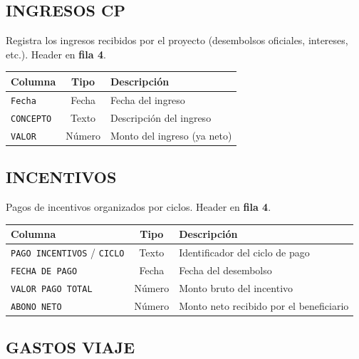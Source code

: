 \documentclass[11pt,a4paper]{article}
\begin{document}
\subsection{INGRESOS CP}

Registra los ingresos recibidos por el proyecto (desembolsos oficiales, intereses, etc.). Header en \textbf{fila 4}.

\begin{center}
\renewcommand{\arraystretch}{1.3}
\begin{tabular}{|l|c|p{7cm}|}
\hline
\rowcolor{verde!15}
\textbf{Columna} & \textbf{Tipo} & \textbf{Descripción} \\
\hline
\texttt{Fecha} & Fecha & Fecha del ingreso \\
\hline
\texttt{CONCEPTO} & Texto & Descripción del ingreso \\
\hline
\texttt{VALOR} & Número & Monto del ingreso (ya neto) \\
\hline
\end{tabular}
\end{center}

\subsection{INCENTIVOS}

Pagos de incentivos organizados por ciclos. Header en \textbf{fila 4}.

\begin{center}
\renewcommand{\arraystretch}{1.3}
\begin{tabular}{|l|c|p{7cm}|}
\hline
\rowcolor{verde!15}
\textbf{Columna} & \textbf{Tipo} & \textbf{Descripción} \\
\hline
\texttt{PAGO INCENTIVOS} / \texttt{CICLO} & Texto & Identificador del ciclo de pago \\
\hline
\texttt{FECHA DE PAGO} & Fecha & Fecha del desembolso \\
\hline
\texttt{VALOR PAGO TOTAL} & Número & Monto bruto del incentivo \\
\hline
\texttt{ABONO NETO} & Número & Monto neto recibido por el beneficiario \\
\hline
\end{tabular}
\end{center}

\subsection{GASTOS VIAJE}
\end{document}
